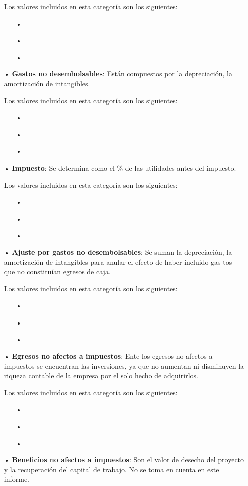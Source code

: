 \begin{enumerate}
Los valores incluidos en esta categoría son los siguientes:
\begin{enumerate}
\item[•]
\item[•]
\item[•]
\end{enumerate}



\item[•]\textbf{Gastos no desembolsables}:
Están compuestos por la depreciación, la amortización de intangibles.

Los valores incluidos en esta categoría son los siguientes:
\begin{enumerate}
\item[•]
\item[•]
\item[•]
\end{enumerate}




\item[•]\textbf{Impuesto}:
Se determina como el \% de las utilidades antes del impuesto.

Los valores incluidos en esta categoría son los siguientes:
\begin{enumerate}
\item[•]
\item[•]
\item[•]
\end{enumerate}



\item[•]\textbf{Ajuste por gastos no desembolsables}:
Se suman la depreciación, la amortización 
de intangibles para anular el efecto de haber incluido gas-tos que no constituían egresos de caja.

Los valores incluidos en esta categoría son los siguientes:
\begin{enumerate}
\item[•]
\item[•]
\item[•]
\end{enumerate}


\item[•]\textbf{Egresos no afectos a impuestos}:
Ente los egresos no afectos a impuestos se encuentran las inversiones, ya que no aumentan ni disminuyen la riqueza contable de la empresa por el solo hecho de adquirirlos.

Los valores incluidos en esta categoría son los siguientes:
\begin{enumerate}
\item[•]
\item[•]
\item[•]
\end{enumerate}


\item[•]\textbf{Beneficios no afectos a impuestos}:
Son el valor de desecho del proyecto y la recuperación del capital de trabajo. No se toma en cuenta en este informe.



\end{enumerate}